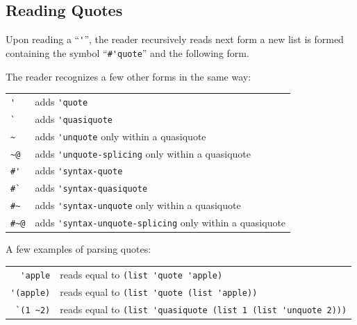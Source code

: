 \subsection{Reading Quotes}
\label{subsec:aml-base-lang-reader-quotes}

Upon reading a ``\lstinline!'!'', the reader recursively reads next form a new list is formed containing the symbol ``\lstinline!#'quote!'' and the following form. 

The reader recognizes a few other forms in the same way:

\begin{tabular}{ l l }
  \lstinline!'! & adds \lstinline!'quote! \\
  \lstinline!`! & adds \lstinline!'quasiquote! \\
  \lstinline!~! & adds \lstinline!'unquote! only within a quasiquote \\
  \lstinline!~@! & adds \lstinline!'unquote-splicing! only within a quasiquote \\
  \lstinline!#'! & adds \lstinline!'syntax-quote! \\
  \lstinline!#`! & adds \lstinline!'syntax-quasiquote! \\
  \lstinline!#~! & adds \lstinline!'syntax-unquote! only within a quasiquote \\
  \lstinline!#~@! & adds \lstinline!'syntax-unquote-splicing! only within a quasiquote \\
\end{tabular}

\example A few examples of parsing quotes:

\begin{tabular}{ r l }
  \lstinline!'apple! & reads equal to \lstinline!(list 'quote 'apple)! \\
  \lstinline!'(apple)! & reads equal to \lstinline!(list 'quote (list 'apple))! \\
  \lstinline!`(1 ~2)! & reads equal to \lstinline!(list 'quasiquote (list 1 (list 'unquote 2)))! \\
\end{tabular}


